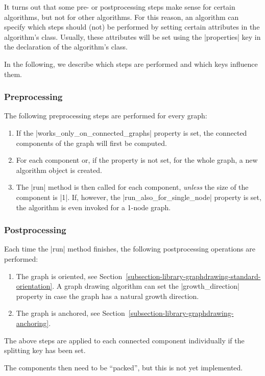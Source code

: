 It turns out that some pre- or postprocessing steps make sense for
certain algorithms, but not for other algorithms. For this reason, an
algorithm can specify which steps should (not) be performed by setting
certain attributes in the algorithm's class. Usually, these attributes
will be set using the |properties| key in the declaration of the
algorithm's class.

In the following, we describe which steps are performed and which keys
influence them.


\subsubsection{Preprocessing}

The following preprocessing steps are performed for every graph:
\begin{enumerate}
\item If the |works_only_on_connected_graphs| property is set, the
  connected components of the graph will first be computed.
\item For each component or, if the property is not set, for the whole
  graph, a new algorithm object is created.
\item The |run| method is then called for each component,
  \emph{unless} the size of the component is |1|. If, however, the
  |run_also_for_single_node| property is set, the algorithm is even
  invoked for a 1-node graph.
\end{enumerate}

\subsubsection{Postprocessing}

Each time the |run| method finishes, the following postprocessing
operations are performed:
\begin{enumerate}
\item The graph is oriented, see
  Section~\ref{subsection-library-graphdrawing-standard-orientation}. A
  graph drawing algorithm can set the |growth_direction| property in
  case the graph has a natural growth direction.
\item The graph is anchored, see
  Section~\ref{subsection-library-graphdrawing-anchoring}. 
\end{enumerate}
The above steps are applied to each connected component individually
if the splitting key has been set.

The components then need to be ``packed'', but this is not yet
implemented.




